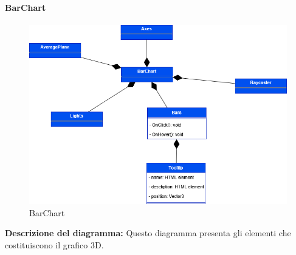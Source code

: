 \paragraph{BarChart}
\begin{figure}[h!] \centering
    \includegraphics[scale=0.45]{template/images/uml_front/ui/barchart.png}
    \caption{BarChart}
\end{figure}
\textbf{Descrizione del diagramma:}
Questo diagramma presenta gli elementi che costituiscono il grafico 3D.

